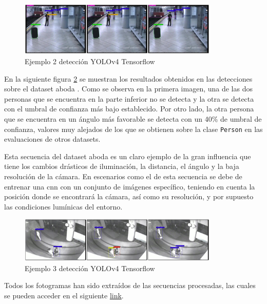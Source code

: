 \begin{figure}[ht]
\centering
\includegraphics[width=0.85\textwidth]{img/chapters/resultados/deteccion/avss-easy-detection-example.jpg}
\caption{\label{fig:avss-easy-detection-example}Ejemplo 2 detección YOLOv4 Tensorflow \cite{AVSSAB2007-dataset}}
\end{figure}

En la siguiente figura \ref{fig:aboda-video5-detection-example} se muestran los resultados obtenidos en las detecciones sobre el dataset \gls{aboda} \cite{aboda-dataset}. Como se observa en la primera imagen, una de las dos personas que se encuentra en la parte inferior no se detecta y la otra se detecta con el umbral de confianza más bajo establecido. Por otro lado, la otra persona que se encuentra en un ángulo más favorable se detecta con un 40\% de umbral de confianza, valores muy alejados de los que se obtienen sobre la clase \texttt{Person} en las evaluaciones de otros datasets.

Esta secuencia del dataset \gls{aboda} es un claro ejemplo de la gran influencia que tiene los cambios drásticos de iluminación, la distancia, el ángulo y la baja resolución de la cámara. En escenarios como el de esta secuencia se debe de entrenar una \gls{cnn} con un conjunto de imágenes específico, teniendo en cuenta la posición donde se encontrará la cámara, así como su resolución, y por supuesto las condiciones lumínicas del entorno.

\begin{figure}[ht]
\centering
\includegraphics[width=0.85\textwidth]{img/chapters/resultados/deteccion/aboda-video5-detection-example.jpg}
\caption{\label{fig:aboda-video5-detection-example}Ejemplo 3 detección YOLOv4 Tensorflow \cite{aboda-dataset}}
\end{figure}

Todos los fotogramas han sido extraídos de las secuencias procesadas, las cuales se pueden acceder en el siguiente \href{https://drive.google.com/drive/folders/1hkUSC78H5moLyTqoNy0e0RhQTJSPt_um?usp=sharing}{link}.

